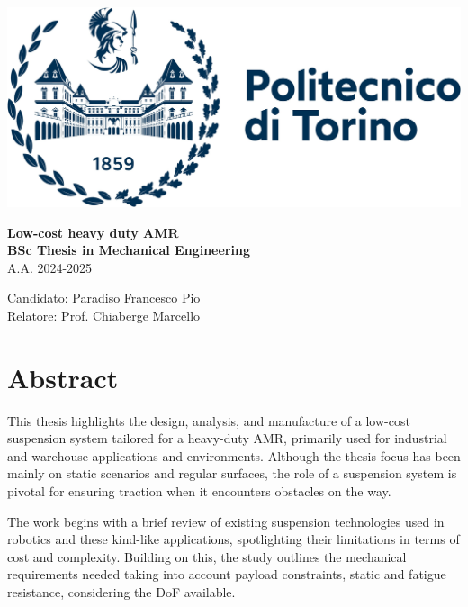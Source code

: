 \documentclass[11pt]{article}
\begin{document}
\thispagestyle{empty}

\begin{flushright}
    \includegraphics[width=0.4\linewidth]{images/Politecnico di Torino logo}
\end{flushright}

\vspace*{7cm}

\begin{flushleft}
    {\Huge\bfseries Low-cost heavy duty AMR} \\
    \vspace{0.5cm}
    {\Large\bfseries BSc Thesis in Mechanical Engineering} \\
    \vspace{0.5cm}
    {\large A.A. 2024-2025} \\
    \vspace{1cm}

    {\large Candidato: Paradiso Francesco Pio} \\
    \vspace{0.5cm}
    {\large Relatore: Prof. Chiaberge Marcello} \\
\end{flushleft}

\vfill

\newpage
\thispagestyle{empty}

\section*{Abstract}
This thesis highlights the design, analysis, and manufacture of a low-cost suspension system tailored for a heavy-duty AMR, primarily used for industrial and warehouse applications and environments. Although the thesis focus has been mainly on static scenarios and regular surfaces, the role of a suspension system is pivotal for ensuring traction when it encounters obstacles on the way.

The work begins with a brief review of existing suspension technologies used in robotics and these kind-like applications, spotlighting their limitations in terms of cost and complexity. Building on this, the study outlines the mechanical requirements needed taking into account payload constraints, static and fatigue resistance, considering the DoF available.
\end{document}
